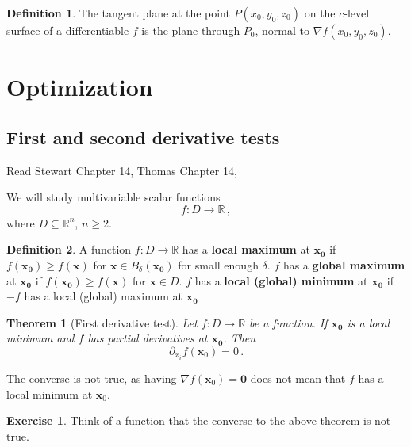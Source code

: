 \documentclass[
]{article}
\newtheorem{theorem}{Theorem}[section]
\theoremstyle{definition}
\newtheorem{definition}{Definition}[section]
\theoremstyle{definition}
\theoremstyle{definition}
\newtheorem{exercise}{Exercise}[section]
\theoremstyle{definition}
\theoremstyle{remark}
\begin{document}
\begin{definition}
The tangent plane at the point \(P(x_0, y_0, z_0)\) on the \(c\)-level surface of a differentiable \(f\)
is the plane through \(P_0\), normal to \(\nabla f (x_0, y_0, z_0)\).
\end{definition}

\newpage

\section{Optimization}\label{optimization}

\subsection{First and second derivative tests}\label{first-and-second-derivative-tests}

Read Stewart Chapter 14, Thomas Chapter 14,

We will study multivariable scalar functions
\[ f: D \to \mathbb{R}\,,\]
where \(D\subseteq \mathbb{R}^n\), \(n\geq 2\).

\begin{definition}
A function \(f:D \to \mathbb{R}\) has a \textbf{local maximum} at \(\mathbf{x_0}\) if
\(f(\mathbf{x_0}) \geq f(\mathbf{x})\) for \(\mathbf{x} \in B_\delta(\mathbf{x_0})\) for small enough \(\delta\).
\(f\) has a \textbf{global maximum} at \(\mathbf{x_0}\) if
\(f(\mathbf{x_0}) \geq f(\mathbf{x})\) for \(\mathbf{x} \in D\).
\(f\) has a \textbf{local (global) minimum} at \(\mathbf{x_0}\) if
\(-f\) has a local (global) maximum at \(\mathbf{x_0}\)
\end{definition}

\begin{theorem}[First derivative test]
Let \(f:D \to \mathbb{R}\) be a function.
If \(\mathbf{x_0}\) is a local minimum and \(f\) has partial derivatives at \(\mathbf{x_0}\).
Then
\begin{equation*}
    \partial_{x_i} f(\mathbf{x}_0) = 0 \,.
\end{equation*}
\end{theorem}

The converse is not true, as having \(\nabla f(\mathbf{x}_0) = \mathbf{0}\) does not mean
that \(f\) has a local minimum at \(\mathbf{x}_0\).

\begin{exercise}
Think of a function that the converse to the above theorem is not true.
\end{exercise}
\end{document}
